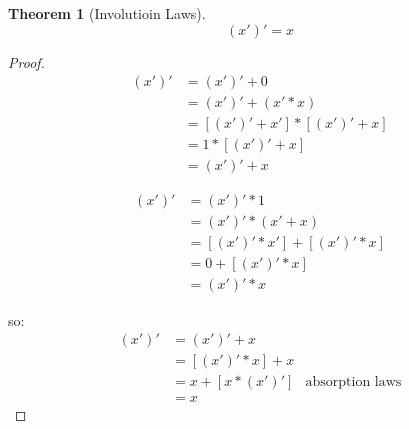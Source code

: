 \documentclass{article}
\newtheorem{theorem}{Theorem}[section]
\begin{document}
\newpage
\begin{theorem}[Involutioin Laws]
\label{involutioin}
\[ (x')' =x \]
\end{theorem}

\begin{proof}
\begin{align*}
(x')' & = (x')' + 0 \\
      & = (x')' + (x' * x) \\
      & = [(x')' + x'] * [(x')' + x]\\
      & = 1 * [(x')' + x] \\
      & = (x')' + x
\end{align*}

\begin{align*}
(x')' & = (x')' * 1 \\
      & = (x')' * (x' + x) \\
      & = [(x')' * x'] + [(x')' * x]\\
      & = 0 + [(x')' * x] \\
      & = (x')' * x
\end{align*}

so:
\begin{align*}
(x')' & = (x')' + x \\
      & = [(x')' * x] + x \\
      & = x + [x * (x')'] & \text{absorption laws} \\
      & = x
\end{align*}

\end{proof}
\end{document}
